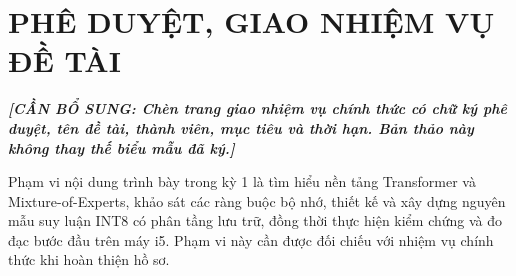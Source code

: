 \chapter*{PHÊ DUYỆT, GIAO NHIỆM VỤ ĐỀ TÀI}

\begin{center}
\textit{\textbf{[CẦN BỔ SUNG: Chèn trang giao nhiệm vụ chính thức có chữ ký phê duyệt, tên đề tài, thành viên, mục tiêu và thời hạn. Bản thảo này không thay thế biểu mẫu đã ký.]}}
\end{center}

\vspace{0.5cm}

Phạm vi nội dung trình bày trong kỳ 1 là tìm hiểu nền tảng Transformer và Mixture-of-Experts, khảo sát các ràng buộc bộ nhớ, thiết kế và xây dựng nguyên mẫu suy luận INT8 có phân tầng lưu trữ, đồng thời thực hiện kiểm chứng và đo đạc bước đầu trên máy i5. Phạm vi này cần được đối chiếu với nhiệm vụ chính thức khi hoàn thiện hồ sơ.

